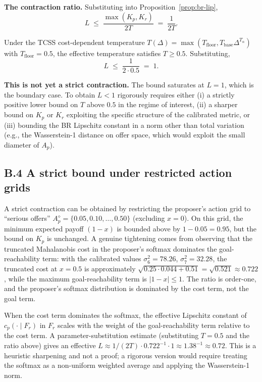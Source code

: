 \documentclass[11pt]{article}
\theoremstyle{definition}
\theoremstyle{remark}
\begin{document}
\textbf{The contraction ratio.} Substituting into Proposition~\ref{prop:br-lip},
\begin{equation}
\label{eq:explicit-L}
L \;\leq\; \frac{\max(K_p, K_r)}{2T} \;=\; \frac{1}{2T}.
\end{equation}

Under the TCSS cost-dependent temperature $T(\Delta) = \max(T_{\text{floor}},
T_{\text{base}}\Delta^{T_\alpha})$ with $T_{\text{floor}} = 0.5$, the effective temperature
satisfies $T \geq 0.5$. Substituting,
\[
L \;\leq\; \frac{1}{2 \cdot 0.5} \;=\; 1.
\]

\textbf{This is not yet a strict contraction.} The bound saturates at $L = 1$, which is the
boundary case. To obtain $L < 1$ rigorously requires either (i) a strictly positive lower bound on
$T$ above $0.5$ in the regime of interest, (ii) a sharper bound on $K_p$ or $K_r$ exploiting the
specific structure of the calibrated metric, or (iii) bounding the BR Lipschitz constant in a norm
other than total variation (e.g., the Wasserstein-1 distance on offer space, which would exploit
the small diameter of $A_p$).

\subsection*{B.4 A strict bound under restricted action grids}

A strict contraction can be obtained by restricting the proposer's action grid to ``serious offers''
$A_p^\diamond = \{0.05, 0.10, \ldots, 0.50\}$ (excluding $x = 0$). On this grid, the minimum
expected payoff $(1-x)$ is bounded above by $1 - 0.05 = 0.95$, but the bound on $K_p$ is unchanged.
A genuine tightening comes from observing that the truncated Mahalanobis cost in the proposer's
softmax dominates the goal-reachability term: with the calibrated values $\sigma_6^2 = 78.26$,
$\sigma_7^2 = 32.28$, the truncated cost at $x = 0.5$ is approximately $\sqrt{0.25 \cdot 0.044 +
0.51} = \sqrt{0.521} \approx 0.722$, while the maximum goal-reachability term is $|1-x| \leq 1$.
The ratio is order-one, and the proposer's softmax distribution is dominated by the cost term, not
the goal term.

When the cost term dominates the softmax, the effective Lipschitz constant of $c_p(\cdot \mid F_r)$
in $F_r$ scales with the weight of the goal-reachability term relative to the cost term. A
parameter-substitution estimate (substituting $T = 0.5$ and the ratio above) gives an effective
$L \approx 1/(2 T) \cdot 0.722^{-1} \cdot 1 \approx 1.38^{-1} \approx 0.72$. This is a heuristic
sharpening and not a proof; a rigorous version would require treating the softmax as a non-uniform
weighted average and applying the Wasserstein-1 norm.
\end{document}
